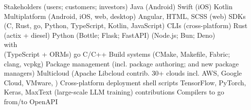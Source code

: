 \documentclass[11pt, a4paper]{article}
\begin{document}
\begin{minipage}[t]{0.56\textwidth}
\begin{tcbitemize}[raster columns=1, outerbox,
    raster row skip=2pt]
    \tcbitem[colback=mybluei!40]
        \begin{tcbitemize}[raster columns=6, raster rows=5,
            raster equal height=all,
            raster row skip=1pt,
            raster column skip=1pt,
            title style={left color=yellow!50!blue,right color=blue!50!green!50!black},
            innerbox]
            \tcbitem[raster multicolumn=6, colframe=blue!50!green!50!black, colback=blue!50!green!50!black, height=1cm] Stakeholders (users; customers; investors)
            \tcbitem Java (\mbox{Android})
            \tcbitem Swift (iOS)
            \tcbitem Kotlin Multiplatform (Android, iOS, web, desktop)
            \tcbitem Angular, HTML, SCSS (web)
            \tcbitem SDKs (C, Rust, go, Python, TypeScript, Kotlin, JavaScript)
            \tcbitem CLIs (cross-platform)
            \tcbitem[colback=myorange] Rust (actix + diesel)
            \tcbitem[colback=myorange] Python (Bottle; Flask; FastAPI)
            \tcbitem[raster multicolumn=2, colback=myorange] (Node.js; Bun; Deno)\\with\\(TypeScript + ORMs)
            \tcbitem[colback=myorange] go
            \tcbitem[colback=myorange] C/C++
            \tcbitem[colback=purple]Build systems (CMake, Makefile, Fabric; clang, vcpkg)
            \tcbitem[raster multicolumn=2, colback=purple] Package management (incl. package authoring; and new package managers)
            \tcbitem[raster multicolumn=2, colback=purple] Multicloud (Apache Libcloud contrib. 30+ clouds incl. AWS, Google Cloud, VMware, \textellipsis{})
            \tcbitem[colback=purple] Cross-platform deployment shell scripts
            \tcbitem[raster multicolumn=3,colback=darkpink] TensorFlow, PyTorch, Keras, MaxText (large-scale LLM training) contributions
            \tcbitem[raster multicolumn=3, colback=mygreen!140] Compilers to go from/to OpenAPI
        \end{tcbitemize}
\end{tcbitemize}

\end{minipage}
\end{document}
